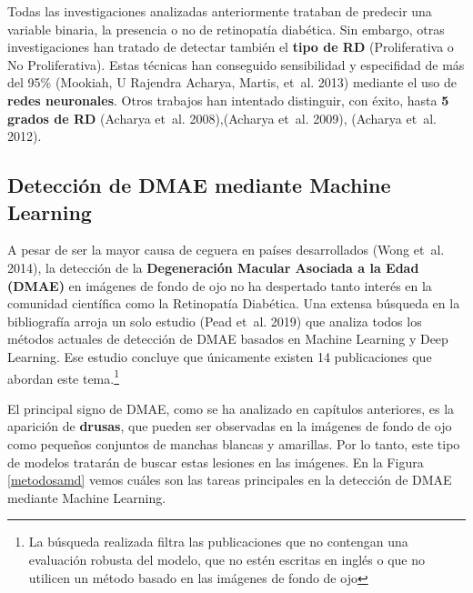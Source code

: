\documentclass[
  12pt,
  spanish,
  a4paperpaper,
]{report}
\begin{document}
Todas las investigaciones analizadas anteriormente trataban de predecir
una variable binaria, la presencia o no de retinopatía diabética. Sin
embargo, otras investigaciones han tratado de detectar también el
\textbf{tipo de RD} (Proliferativa o No Proliferativa). Estas técnicas
han conseguido sensibilidad y especifidad de más del 95\% (Mookiah, U
Rajendra Acharya, Martis, et~al. 2013) mediante el uso de \textbf{redes
neuronales}. Otros trabajos han intentado distinguir, con éxito, hasta
\textbf{5 grados de RD} (Acharya et~al. 2008),(Acharya et~al. 2009),
(Acharya et~al. 2012).

\hypertarget{detecciuxf3n-de-dmae-mediante-machine-learning}{%
\subsection{Detección de DMAE mediante Machine
Learning}\label{detecciuxf3n-de-dmae-mediante-machine-learning}}

A pesar de ser la mayor causa de ceguera en países desarrollados (Wong
et~al. 2014), la detección de la \textbf{Degeneración Macular Asociada a
la Edad (DMAE)} en imágenes de fondo de ojo no ha despertado tanto
interés en la comunidad científica como la Retinopatía Diabética. Una
extensa búsqueda en la bibliografía arroja un solo estudio (Pead et~al.
2019) que analiza todos los métodos actuales de detección de DMAE
basados en Machine Learning y Deep Learning. Ese estudio concluye que
únicamente existen 14 publicaciones que abordan este tema.\footnote{La
  búsqueda realizada filtra las publicaciones que no contengan una
  evaluación robusta del modelo, que no estén escritas en inglés o que
  no utilicen un método basado en las imágenes de fondo de ojo}

El principal signo de DMAE, como se ha analizado en capítulos
anteriores, es la aparición de \textbf{drusas}, que pueden ser
observadas en la imágenes de fondo de ojo como pequeños conjuntos de
manchas blancas y amarillas. Por lo tanto, este tipo de modelos tratarán
de buscar estas lesiones en las imágenes. En la Figura \ref{metodosamd}
vemos cuáles son las tareas principales en la detección de DMAE mediante
Machine Learning.
\end{document}
